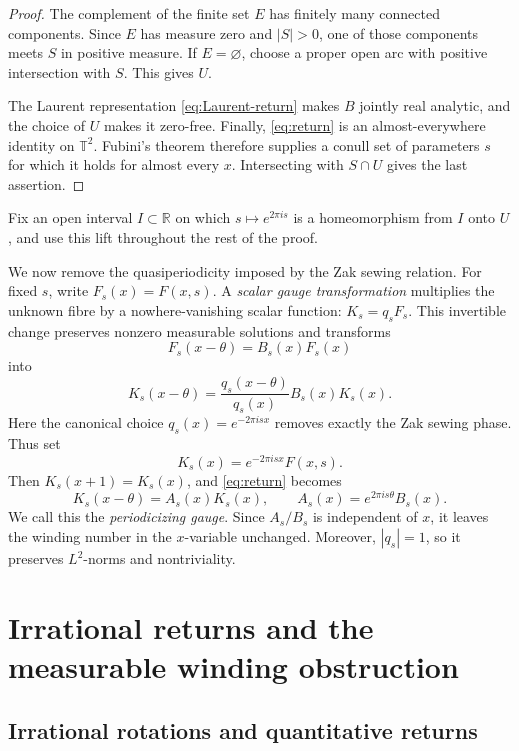 \documentclass[reqno]{amsart}
\theoremstyle{remark}
\numberwithin{equation}{section}
\newcommand{\R}{\mathbb{R}}
\newcommand{\T}{\mathbb{T}}
\begin{document}
\begin{proof}
The complement of the finite set \(E\) has finitely many connected
components. Since \(E\) has measure zero and \(|S|>0\), one of those
components meets \(S\) in positive measure. If \(E=\varnothing\), choose a
proper open arc with positive intersection with \(S\). This gives \(U\).

The Laurent representation \eqref{eq:Laurent-return} makes \(B\) jointly real
analytic, and the choice of \(U\) makes it zero-free. Finally,
\eqref{eq:return} is an almost-everywhere identity on \(\T^2\). Fubini's
theorem therefore supplies a conull set of parameters \(s\) for which it holds
for almost every \(x\). Intersecting with \(S\cap U\) gives the last
assertion.
\end{proof}

Fix an open interval \(I\subset\R\) on which
\(s\mapsto e^{2\pi i s}\) is a homeomorphism from \(I\) onto \(U\), and
use this lift throughout the rest of the proof.

We now remove the quasiperiodicity imposed by the Zak sewing relation. For
fixed \(s\), write \(F_s(x)=F(x,s)\). A \emph{scalar gauge transformation}
multiplies the unknown fibre by a nowhere-vanishing scalar function:
\(K_s=q_sF_s\). This invertible change preserves nonzero measurable solutions
and transforms
\[
  F_s(x-\theta)=B_s(x)F_s(x)
\]
into
\[
  K_s(x-\theta)
  =\frac{q_s(x-\theta)}{q_s(x)}B_s(x)K_s(x).
\]
Here the canonical choice \(q_s(x)=e^{-2\pi i s x}\) removes exactly the Zak
sewing phase. Thus set
\begin{equation}
  K_s(x)=e^{-2\pi i s x}F(x,s).
  \label{eq:periodic-gauge}
\end{equation}
Then \(K_s(x+1)=K_s(x)\), and \eqref{eq:return} becomes
\begin{equation}
  K_s(x-\theta)=A_s(x)K_s(x),
  \qquad
  A_s(x)=e^{2\pi i s\theta}B_s(x).
  \label{eq:gauged-cocycle}
\end{equation}
We call this the \emph{periodicizing gauge}. Since \(A_s/B_s\) is independent
of \(x\), it leaves the winding number in the \(x\)-variable unchanged.
Moreover, \(|q_s|=1\), so it preserves \(L^2\)-norms and nontriviality.

\section{Irrational returns and the measurable winding obstruction}
\label{sec:winding}

\subsection{Irrational rotations and quantitative returns}
\end{document}
